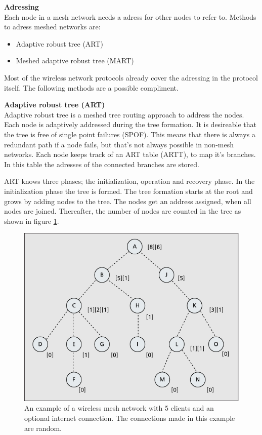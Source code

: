 \documentclass[10pt,a4paper]{article}
\begin{document}
\textbf{Adressing}\\
Each node in a mesh network needs a adress for other nodes to refer to. Methods to adress meshed networks are:
\begin{itemize}
\setlength\itemsep{0em}
    \item Adaptive robust tree (ART)
    \item Meshed adaptive robust tree (MART)
\end{itemize}
Most of the wireless network protocols already cover the adressing in the protocol itself. The following methods are a possible compliment.

\textbf{Adaptive robust tree (ART)}\\
Adaptive robust tree is a meshed tree routing approach to address the nodes. Each node is adaptively addressed during the tree formation. It is desireable that the tree is free of single point failures (SPOF). This means that there is always a redundant path if a node fails, but that's not always possible in non-mesh networks. Each node keeps track of an ART table (ARTT), to map it's branches. In this table the adresses of the connected branches are stored.

ART knows three phases; the initialization, operation and recovery phase. In the initialization phase the tree is formed. The tree formation starts at the root and grows by adding nodes to the tree. The nodes get an address assigned, when all nodes are joined. Thereafter, the number of nodes are counted in the tree as shown in figure \ref{fig:treenumbers}.

\begin{figure}[H]
   \centering
   \includegraphics[width=1\textwidth]{treenumbers}
   \caption{An example of a wireless mesh network with 5 clients and an optional internet connection. The connections made in this example are random.}
   \label{fig:treenumbers}
\end{figure}
\end{document}
